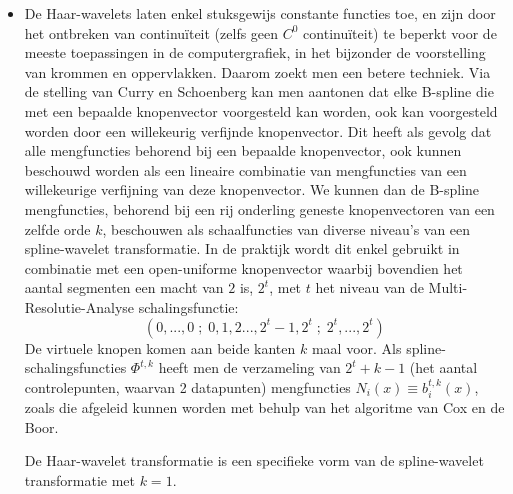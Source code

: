 \begin{enumerate}
			
	{
		\begin{itemize} 
			\item De Haar-wavelets laten enkel stuksgewijs constante functies toe, en zijn door het ontbreken van continuïteit (zelfs geen $C^0$ continuïteit) te beperkt voor de meeste toepassingen in de computergrafiek, in het bijzonder de voorstelling van krommen en oppervlakken. Daarom zoekt men een betere techniek. Via de stelling van Curry en Schoenberg kan men aantonen dat elke B-spline die met een bepaalde knopenvector voorgesteld kan worden, ook kan voorgesteld worden door een willekeurig verfijnde knopenvector. Dit heeft als gevolg dat alle mengfuncties behorend bij een bepaalde knopenvector, ook kunnen beschouwd worden als een lineaire combinatie van mengfuncties van een willekeurige verfijning van deze knopenvector. We kunnen dan de B-spline mengfuncties, behorend bij een rij onderling geneste knopenvectoren van een zelfde orde $k$, beschouwen als schaalfuncties van diverse niveau's van een spline-wavelet transformatie. In de praktijk wordt dit enkel gebruikt in combinatie met een open-uniforme knopenvector waarbij bovendien het aantal segmenten een macht van $2$ is, $2^t$, met $t$ het niveau van de Multi-Resolutie-Analyse schalingsfunctie:
			$$(0, ...,0\;;\;0,1,2...,2^t-1,2^t\;;\;2^t,...,2^t)$$
			De virtuele knopen komen aan beide kanten $k$ maal voor. Als spline-schalingsfuncties $\Phi^{t, k}$ heeft men de verzameling van $2^t + k - 1$ (het aantal controlepunten, waarvan 2 datapunten) mengfuncties $N_i(x) \equiv b_i^{t, k}(x)$, zoals die afgeleid kunnen worden met behulp van het algoritme van Cox en de Boor.
			
			De Haar-wavelet transformatie is een specifieke vorm van de spline-wavelet transformatie met $k = 1$. 


\end{itemize}}
\end{enumerate}
